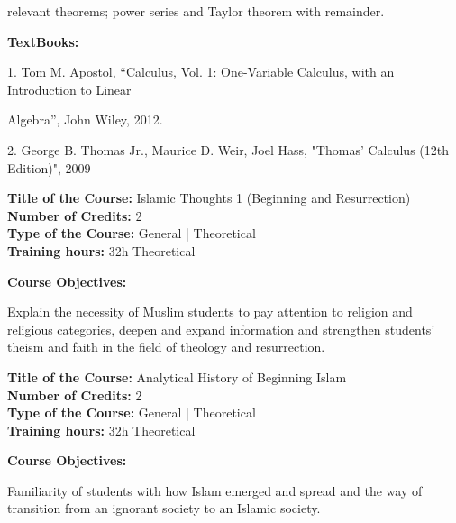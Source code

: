 \documentclass[12pt,a4paper]{article}
\begin{document}
relevant theorems; power series and Taylor theorem with remainder.\par\vspace{4pt}
\textbf{TextBooks:}\par\vspace{2pt}
1. Tom M. Apostol, “Calculus, Vol. 1: One-Variable Calculus, with an Introduction to Linear\par
Algebra”, John Wiley, 2012.\par
2. George B. Thomas Jr., Maurice D. Weir, Joel Hass, "Thomas' Calculus (12th Edition)", 2009\par
\vspace{4pt}

\newpage
\nopagebreak
\textbf{Title of the Course:} Islamic Thoughts 1 (Beginning and Resurrection)\\
\textbf{Number of Credits:} 2\\
\textbf{Type of the Course:} General | Theoretical\\
\textbf{Training hours:} 32h Theoretical\par\vspace{4pt}
\textbf{Course Objectives:}\par\vspace{2pt}
Explain the necessity of Muslim students to pay attention to religion and religious categories,
deepen and expand information and strengthen students' theism and faith in the field of theology
and resurrection.\par\vspace{4pt}

\par\vspace{14pt}
\nopagebreak
\textbf{Title of the Course:} Analytical History of Beginning Islam\\
\textbf{Number of Credits:} 2\\
\textbf{Type of the Course:} General | Theoretical\\
\textbf{Training hours:} 32h Theoretical\par\vspace{4pt}
\textbf{Course Objectives:}\par\vspace{2pt}
Familiarity of students with how Islam emerged and spread and the way of transition from an
ignorant society to an Islamic society.\par\vspace{4pt}
\end{document}

